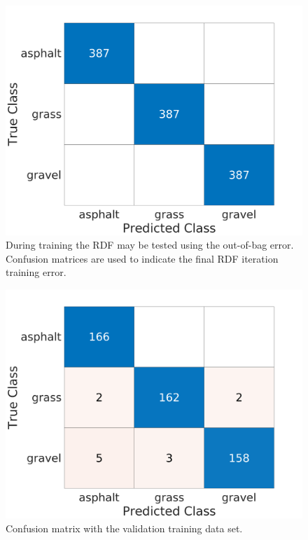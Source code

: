 \documentclass[journal,onecolumn]{IEEEtran}
\begin{document}
			\begin{figure}[H]
				\centering
				\includegraphics[width=0.75\linewidth]{figures/chan_2c_conf_OOB_mat222}
				\caption[Out-of-Bag Error]{During training the RDF may be tested using the out-of-bag error. Confusion matrices are used to indicate the final RDF iteration training error.}
				\label{fig:out_of_bag_err_conf_mat}
			\end{figure}
		
			\begin{figure}[H]
				\centering
				\includegraphics[width=0.75\linewidth]{figures/chan_2c_conf_VALIDATION_mat222}
				\caption[Validation Error]{Confusion matrix with the validation training data set.}
				\label{fig:vali_err_conf_mat}
			\end{figure}

			
			
\end{document}
